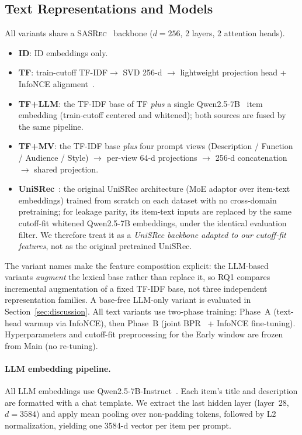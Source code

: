\documentclass[sigconf,natbib=true,anonymous]{acmart}
\newcommand{\tfidf}{\textsc{TF-IDF}\xspace}
\newcommand{\tfllm}{\textsc{TF+LLM}\xspace}
\newcommand{\tfmv}{\textsc{TF+MV}\xspace}
\newcommand{\base}{\textsc{SASRec}\xspace}
\begin{document}
\subsection{Text Representations and Models}
\label{sec:models}

All variants share a \base~\cite{kang2018sasrec} backbone ($d{=}256$, 2 layers, 2 attention heads).

\begin{itemize}[leftmargin=*,itemsep=1pt]
\item \textbf{ID}: ID embeddings only.
\item \textbf{TF}: train-cutoff \tfidf $\to$ SVD 256-d $\to$ lightweight projection head + InfoNCE alignment~\cite{oord2018cpc}.
\item \textbf{\tfllm}: the \tfidf base of TF \emph{plus} a single Qwen2.5-7B~\cite{qwen2024qwen25} item embedding (train-cutoff centered and whitened); both sources are fused by the same pipeline.
\item \textbf{\tfmv}: the \tfidf base \emph{plus} four prompt views (Description / Function / Audience / Style) $\to$ per-view 64-d projections $\to$ 256-d concatenation $\to$ shared projection.
\item \textbf{UniSRec}~\cite{hou2022unisrec}: the original UniSRec architecture (MoE adaptor over item-text embeddings) trained from scratch on each dataset with no cross-domain pretraining; for leakage parity, its item-text inputs are replaced by the same cutoff-fit whitened Qwen2.5-7B embeddings, under the identical evaluation filter.  We therefore treat it as a \emph{UniSRec backbone adapted to our cutoff-fit features}, not as the original pretrained UniSRec.
\end{itemize}

The variant names make the feature composition explicit: the LLM-based variants \emph{augment} the lexical base rather than replace it, so RQ1 compares incremental augmentation of a fixed \tfidf base, not three independent representation families.
A base-free LLM-only variant is evaluated in Section~\ref{sec:discussion}.
All text variants use two-phase training: Phase~A (text-head warmup via InfoNCE), then Phase~B (joint BPR~\cite{rendle2009bpr} + InfoNCE fine-tuning).
Hyperparameters and cutoff-fit preprocessing for the Early window are frozen from Main (no re-tuning).

\paragraph{LLM embedding pipeline.}
All LLM embeddings use Qwen2.5-7B-Instruct~\cite{qwen2024qwen25}.
Each item's title and description are formatted with a chat template.
We extract the last hidden layer (layer~28, $d{=}3584$) and apply mean pooling over non-padding tokens, followed by L2 normalization, yielding one 3584-d vector per item per prompt.
\end{document}
